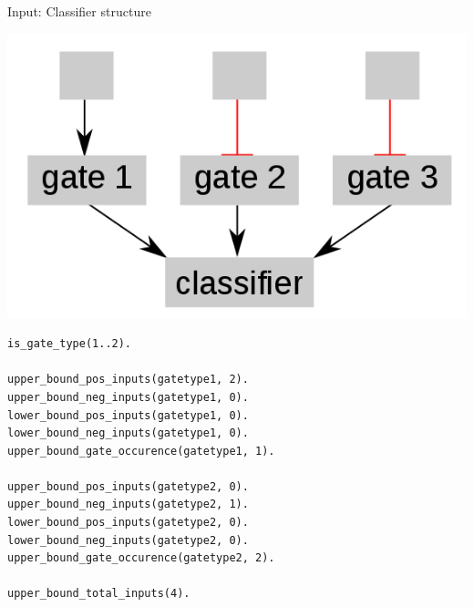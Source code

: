 \documentclass[10pt,dvipsnames]{beamer}
\begin{document}
\begin{frame}[fragile]{Input: Classifier structure}
\begin{center}
\includegraphics[scale=0.2]{classifier.png}
\end{center}
\small
\begin{verbatim}
is_gate_type(1..2).

upper_bound_pos_inputs(gatetype1, 2).
upper_bound_neg_inputs(gatetype1, 0).
lower_bound_pos_inputs(gatetype1, 0).
lower_bound_neg_inputs(gatetype1, 0).
upper_bound_gate_occurence(gatetype1, 1).

upper_bound_pos_inputs(gatetype2, 0).
upper_bound_neg_inputs(gatetype2, 1).
lower_bound_pos_inputs(gatetype2, 0).
lower_bound_neg_inputs(gatetype2, 0).
upper_bound_gate_occurence(gatetype2, 2).

upper_bound_total_inputs(4).
\end{verbatim}
\end{frame}
\end{document}
